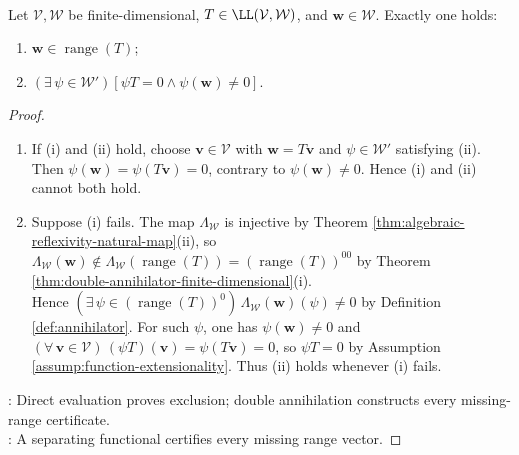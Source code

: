 \begin{theorem} \label{thm:range-membership-dual-alternative} \\
Let $\mathcal{V},\mathcal{W}$ be finite-dimensional, $T\in\LL(\mathcal{V},\mathcal{W})$, and $\mathbf{w}\in\mathcal{W}$. Exactly one holds:
\begin{enumerate}[label=(\roman*)]
\setlength{\itemsep}{0pt}
\item $\mathbf{w}\in\operatorname{range}(T)$;
\item $(\exists\,\psi\in\mathcal{W}')[\psi T=0\land\psi(\mathbf{w})\neq0]$.
\end{enumerate}
\begin{proof}
\begin{enumerate}[label=(\roman*)]
\setlength{\itemsep}{0pt}
\item If (i) and (ii) hold, choose $\mathbf{v}\in\mathcal{V}$ with $\mathbf{w}=T\mathbf{v}$ and $\psi\in\mathcal{W}'$ satisfying (ii).\\
Then $\psi(\mathbf{w})=\psi(T\mathbf{v})=0$, contrary to $\psi(\mathbf{w})\neq0$. Hence (i) and (ii) cannot both hold.
\item Suppose (i) fails. The map $\Lambda_{\mathcal{W}}$ is injective by Theorem \ref{thm:algebraic-reflexivity-natural-map}(ii), so $\Lambda_{\mathcal{W}}(\mathbf{w})\notin\Lambda_{\mathcal{W}}(\operatorname{range}(T))=(\operatorname{range}(T))^{00}$ by Theorem \ref{thm:double-annihilator-finite-dimensional}(i).\\
Hence $(\exists\,\psi\in(\operatorname{range}(T))^0)\,\Lambda_{\mathcal{W}}(\mathbf{w})(\psi)\neq0$ by Definition \ref{def:annihilator}. For such $\psi$, one has $\psi(\mathbf{w})\neq0$ and $(\forall\,\mathbf{v}\in\mathcal{V})\,(\psi T)(\mathbf{v})=\psi(T\mathbf{v})=0$, so $\psi T=0$ by Assumption \ref{assump:function-extensionality}. Thus (ii) holds whenever (i) fails.
\end{enumerate}
: Direct evaluation proves exclusion; double annihilation constructs every missing-range certificate.\\
: A separating functional certifies every missing range vector.
\end{proof}
\end{theorem}

\begin{illustrationfigure}[H]
  \centering
  
  \caption{The dual certificate $\psi$ vanishes on $\operatorname{range}(T)$ but detects $\mathbf{w}$ outside that range.}
  \label{fig:range-membership-dual-certificate}
\end{illustrationfigure}

